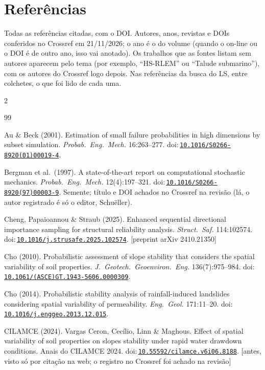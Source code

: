 \documentclass[11pt,a4paper]{article}
\newcommand{\doi}[1]{doi:\,\href{https://doi.org/#1}{\nolinkurl{#1}}}
\begin{document}
\section{Referências}\label{sec:refs}
Todas as referências citadas, com o DOI. Autores, anos, revistas e DOIs conferidos no Crossref em 21/11/2026; o ano é o
do volume (quando o on-line ou o DOI é de outro ano, isso vai anotado). Os trabalhos que as fontes listam sem autores
aparecem pelo tema (por exemplo, ``HS-RLEM'' ou ``Talude submarino''), com os autores do Crossref logo depois. Nas
referências da busca do LS, entre colchetes, o que foi lido de cada uma.
\begin{multicols}{2}\footnotesize\raggedright
\begin{thebibliography}{99}

 Au \& Beck (2001). Estimation of small failure probabilities in high dimensions by
subset simulation. \emph{Probab.\ Eng.\ Mech.} 16:263--277. \doi{10.1016/S0266-8920(01)00019-4}.

 Bergman et al.\ (1997). A state-of-the-art report on computational
stochastic mechanics. \emph{Probab.\ Eng.\ Mech.} 12(4):197--321. \doi{10.1016/S0266-8920(97)00003-9}. Semente;
título e DOI achados no Crossref na revisão (lá, o autor registrado é só o editor, Schuëller).

 Cheng, Papaioannou \& Straub (2025). Enhanced sequential directional importance
sampling for structural reliability analysis. \emph{Struct.\ Saf.} 114:102574. \doi{10.1016/j.strusafe.2025.102574}.
[preprint arXiv 2410.21350]

 Cho (2010). Probabilistic assessment of slope stability that considers the spatial
variability of soil properties. \emph{J.\ Geotech.\ Geoenviron.\ Eng.} 136(7):975--984.
\doi{10.1061/(ASCE)GT.1943-5606.0000309}.

 Cho (2014). Probabilistic stability analysis of rainfall-induced landslides considering
spatial variability of permeability. \emph{Eng.\ Geol.} 171:11--20. \doi{10.1016/j.enggeo.2013.12.015}.

 CILAMCE (2024). Vargas Ceron, Cecílio, Linn \& Maghous. Effect of spatial
variability of soil properties on slopes stability under rapid water drawdown conditions. Anais do CILAMCE 2024.
\doi{10.55592/cilamce.v6i06.8188}. [antes, visto só por citação na web; o registro no Crossref foi achado na revisão]


\end{thebibliography}
\end{multicols}
\end{document}
